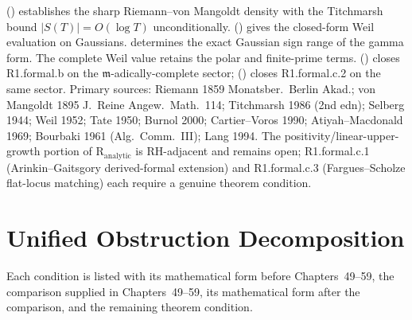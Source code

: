  (\ClaimStatusProvedHere) establishes
the sharp Riemann--von Mangoldt density with the Titchmarsh bound
\(|S(T)|=O(\log T)\) unconditionally.
 (\ClaimStatusProvedHere)
gives the closed-form Weil evaluation on Gaussians.
 determines the exact Gaussian
sign range of the gamma form. The complete Weil value retains the
polar and finite-prime terms.
 (\ClaimStatusProvedHere)
closes R1.formal.b on the \(\mathfrak{m}\)-adically-complete sector;
 (\ClaimStatusProvedHere) closes
R1.formal.c.2 on the same sector.
Primary sources: Riemann 1859 Monatsber.~Berlin Akad.;
von Mangoldt 1895 J.~Reine Angew.~Math.~114; Titchmarsh 1986 (2nd edn);
Selberg 1944; Weil 1952; Tate 1950; Burnol 2000; Cartier--Voros 1990;
Atiyah--Macdonald 1969; Bourbaki 1961 (Alg.~Comm.~III); Lang 1994.
The positivity/linear-upper-growth portion of
\(\mathrm{R}_{\mathrm{analytic}}\) is RH-adjacent and remains open;
R1.formal.c.1 (Arinkin--Gaitsgory derived-formal extension) and
R1.formal.c.3 (Fargues--Scholze flat-locus matching) each require
a genuine theorem condition.

\section{Unified Obstruction Decomposition}
\label{v4-arith:w5-synth:unified-table}

Each condition is listed with its mathematical form before
Chapters~49--59, the comparison supplied in Chapters~49--59, its
mathematical form after the comparison, and the remaining theorem
condition.

